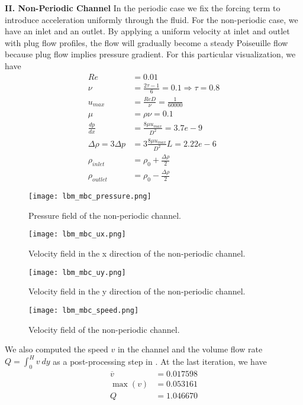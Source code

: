 \textbf{II. Non-Periodic Channel} In the periodic case we fix the forcing term to introduce acceleration uniformly through the fluid. For the non-periodic case, we have an inlet and an outlet. By applying a uniform velocity at inlet and outlet with plug flow profiles, the flow will gradually become a steady Poiseuille flow because plug flow implies pressure gradient. For this particular visualization, we have
\begin{align}
    \textit{Re} &= 0.01 \\
    \nu &= \frac{2\tau - 1}{6} = 0.1 \Rightarrow \tau = 0.8 \\
    u_{max} &= \frac{\textit{Re}D}{\nu} = \frac{1}{60000} \\
    \mu &= \rho \nu = 0.1 \\
    \frac{dp}{dx} &= \frac{8\mu u_{max}}{D^2} = 3.7e-9 \\
    \Delta \rho = 3\Delta p &=3\frac{8\mu u_{max}}{D^2}L=2.22e-6 \\
    \rho_{inlet} &= \rho_0 + \frac{\Delta \rho}{2} \\
    \rho_{outlet} &= \rho_0 - \frac{\Delta \rho}{2}
\end{align}

\begin{figure}[H]
    \centering
    \texttt{[image: lbm\_mbc\_pressure.png]}
    \caption{Pressure field of the non-periodic channel.}
\end{figure}

\begin{figure}[H]
    \centering
    \texttt{[image: lbm\_mbc\_ux.png]}
    \caption{Velocity field in the x direction of the non-periodic channel.}
\end{figure}

\begin{figure}[H]
    \centering
    \texttt{[image: lbm\_mbc\_uy.png]}
    \caption{Velocity field in the y direction of the non-periodic channel.}
\end{figure}

\begin{figure}[H]
    \centering
    \texttt{[image: lbm\_mbc\_speed.png]}
    \caption{Velocity field of the non-periodic channel.}
\end{figure}

We also computed the speed $v$ in the channel and the volume flow rate $Q = \int_0^H v \: dy$ as a post-processing step in . At the last iteration, we have
\begin{align*}
    \overline{v} &= 0.017598 \\
    \max(v) &= 0.053161 \\
    Q &= 1.046670
\end{align*}

